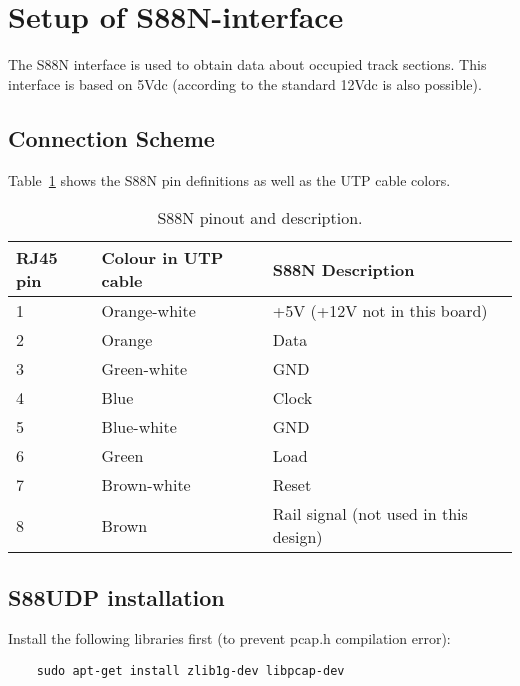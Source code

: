 \section{Setup of S88N-interface}
The S88N interface is used to obtain data about occupied track sections. This interface is based on 5Vdc (according to the standard 12Vdc is also possible).

\subsection{Connection Scheme}
Table~\ref*{tab:S88Npinning} shows the S88N pin definitions as well as the UTP cable colors.

\begin{table}[h]
	\caption{S88N pinout and description.}
	\label{tab:S88Npinning}
	\begin{tabular}{|l|l|l|}
		\hline
		\rowcolor[HTML]{9B9B9B} 
		\textbf{RJ45 pin} & \textbf{Colour in UTP cable} & \textbf{S88N Description}             \\ \hline
		1                 & Orange-white                 & +5V (+12V not in this board)          \\ \hline
		2                 & Orange                       & Data                                  \\ \hline
		3                 & Green-white                  & GND                                   \\ \hline
		4                 & Blue                         & Clock                                 \\ \hline
		5                 & Blue-white                   & GND                                   \\ \hline
		6                 & Green                        & Load                                  \\ \hline
		7                 & Brown-white                  & Reset                                 \\ \hline
		8                 & Brown                        & Rail signal (not used in this design) \\ \hline
	\end{tabular}
\end{table}

\subsection{S88UDP installation}
Install the following libraries first (to prevent pcap.h compilation error):
\begin{verbatim}
	sudo apt-get install zlib1g-dev libpcap-dev	
\end{verbatim}


